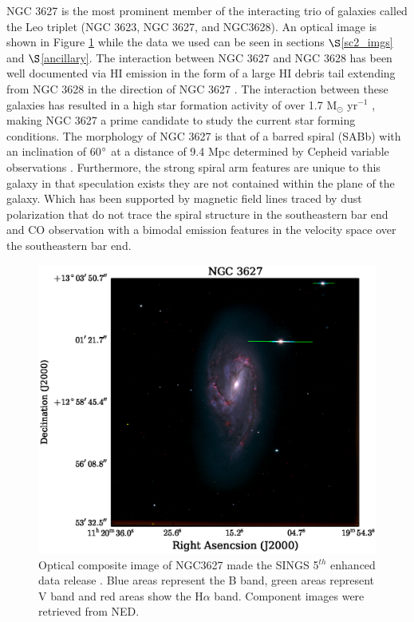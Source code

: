 NGC 3627 is the most prominent member of the interacting trio of galaxies called the Leo triplet (NGC 3623, NGC 3627,  and NGC3628).  An optical image is shown in Figure \ref{fig:ngc3627_opt} while the data we used can be seen in sections $\S$\ref{sc2_imgs} and $\S$\ref{ancillary}.  The interaction between NGC 3627 and NGC 3628 has been well documented via HI emission in the form of a large HI debris tail extending from NGC 3628 in the direction of NGC 3627 \citep{rots1978,haynes1979}.  The interaction between these galaxies has resulted in a high star formation activity of over 1.7 M$_\odot$ yr$^{-1}$ \citep{calzetti2010}, making NGC 3627 a prime candidate to study the current star forming conditions.  The morphology of NGC 3627 is that of a barred spiral (SABb) with an inclination of 60$\degree$ \citep{reuter1996} at a distance of 9.4 Mpc determined by Cepheid variable observations \citep{freedman2001}.  Furthermore, the strong spiral arm features are unique to this galaxy in that speculation exists they are not contained within the plane of the galaxy.  Which has been supported by magnetic field lines traced by dust polarization that do not trace the spiral structure in the southeastern bar end \citep{soida2001} and CO observation with a bimodal emission features in the velocity space over the southeastern bar end\citep{dumke2011}.

\begin{figure}
  \centering
  \includegraphics[width=1.\textwidth]{intro_imgs/rgb_tst.eps}
  \caption{Optical composite image of NGC3627 made the SINGS 5$^{th}$ enhanced data release \citep{kennicutt2003}.  Blue areas represent the B band, green areas represent V band and red areas show the H$\alpha$ band.  Component images were retrieved from NED.}
  \label{fig:ngc3627_opt}
\end{figure}

